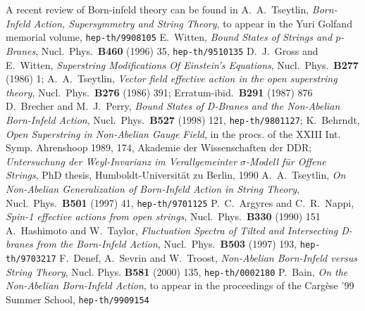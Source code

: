 \documentclass[12pt,a4paper]{article}
\begin{document}
\begin{thebibliography}{99}
   A recent review of Born-infeld theory can be found in
               A.~A.~Tseytlin,
               {\it Born-Infeld Action,  Supersymmetry and String
               Theory},
               to appear in the Yuri Golfand memorial volume,
               {\tt hep-th/9908105}
  E.~Witten,
               {\it Bound States of Strings and $p$-Branes},
               Nucl.~Phys.~{\bf B460} (1996) 35,
               {\tt hep-th/9510135}
   D.~J.~Gross and E.~Witten,
               {\it Superstring Modifications Of Einstein's Equations},
               Nucl.~Phys.~{\bf B277} (1986) 1;
               A.~A.~Tseytlin, 
               {\it Vector field effective action in the open 
               superstring theory},
               Nucl.~Phys.~{\bf B276} (1986) 391; Erratum-ibid.~{\bf B291}
               (1987) 876 
   D.~Brecher and M.~J.~Perry,
               {\it Bound States of D-Branes and the Non-Abelian
                 Born-Infeld Action},
               Nucl.~Phys.~{\bf B527} (1998) 121,
               {\tt hep-th/9801127};
               K.~Behrndt,
               {\it Open Superstring in Non-Abelian Gauge Field},
               in the procs. of the XXIII Int. Symp. Ahrenshoop 1989,
               174, Akademie der Wissenschaften der DDR;
               {\it Untersuchung der
               Weyl-Invarianz im Verallgemeinter $\sigma$-Modell f\"ur Offene
               Strings}, PhD thesis, Humboldt-Universit\"at zu Berlin, 1990
  A.~A.~Tseytlin,
               {\it On Non-Abelian Generalization of Born-Infeld
                 Action in String Theory},
               Nucl.~Phys.~{\bf B501} (1997) 41,
               {\tt hep-th/9701125}
   P.~C.~Argyres and C.~R.~Nappi,
               {\it Spin-1 effective actions from open strings},
               Nucl.~Phys.~{\bf B330} (1990) 151
   A.~Hashimoto and W.~Taylor,
               {\it Fluctuation Spectra of Tilted and Intersecting D-branes
                  from the Born-Infeld Action},
               Nucl.~Phys.~{\bf B503} (1997) 193,
               {\tt hep-th/9703217}
  F.~Denef, A.~Sevrin and W.~Troost,
               {\it Non-Abelian Born-Infeld versus String Theory},
               Nucl. Phys. {\bf B581} (2000) 135,
               {\tt hep-th/0002180}
    P.~Bain,
               {\it On the Non-Abelian Born-Infeld Action},
               to
               appear in the proceedings of the Carg\`ese '99 Summer School,
               {\tt hep-th/9909154}

\end{thebibliography}
\end{document}
